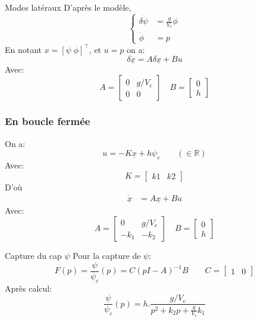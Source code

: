 \documentclass[footheight=2em]{beamer}
\begin{document}
\begin{frame}{Modes lat\'eraux}
    D'apr\`es le mod\`ele,
    \[
        \left\lbrace
        \begin{aligned}
            \delta \dot{\psi} &= \frac{g}{V_e}\phi \\
            \dot{\phi} &= p
        \end{aligned}
        \right.
    \] \pause{}
    En notant \(x = {[\psi \; \phi]}^\top \), et \( u = p \) on a:
    \[
    \delta \underline{\dot{x}} = A \delta \underline{x} + B u
    \] \pause{}
    Avec:
    \[
    A = \begin{bmatrix}
           0 & g/V_e\\
           0 & 0
       \end{bmatrix}
       \quad
       B = \begin{bmatrix}
           0 \\ h
       \end{bmatrix}
   \]
\end{frame}

\begin{frame}
    \frametitle{En boucle fermée} \pause{}
    On a:
    \[
    u = -K \underline{x} + h \psi_c \qquad (\in \mathbb{R})
    \] \pause{}
    Avec:
    \[
    K = \begin{bmatrix}
           k1 & k2
       \end{bmatrix}
   \] \pause{}
   D'où
   \[
       \begin{aligned}
           \dot{\underline{x}} &= A\underline{x} + Bu
       \end{aligned}
    \] \pause{}
    Avec:
    \[
       A = \begin{bmatrix}
           0 & g/V_e\\
           -k_1 & -k_2
       \end{bmatrix}
       \quad
       B = \begin{bmatrix}
           0 \\ h
       \end{bmatrix}
   \]
\end{frame}


\begin{frame}{Capture du cap \( \psi \)}
    Pour la capture de \( \psi \):
    \[
    F(p) = \frac{\psi}{\psi_c}(p) = C{(pI - A)}^{-1}B \qquad C=\begin{bmatrix}
            1 & 0
        \end{bmatrix}
    \] \pause{}
    Après calcul:
    \begin{equation*}
        \boxed{
            \frac{\psi}{\psi_c}(p) = h . \frac{g/V_e}{p^2 + k_2 p + \frac{g}{V_e}k_1}
        }
    \end{equation*}
\end{frame}
\end{document}
